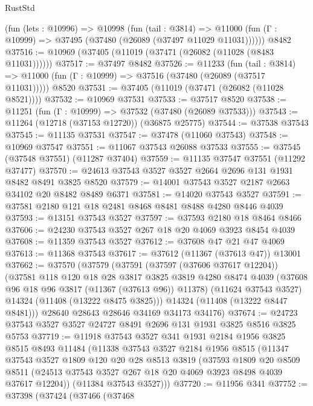 \begin{lexlean}{RustStd}
\begin{coremodule}
    (fun (lets : @10996) =>
    @10998
      (fun (tail : @3814) =>
      @11000 (fun (Γ : @10999) => @37495 (@37480 (@26089 (@37497 @11029 @11031))))))
    @8482
@37516 := @10969 (@37405 (@11019 (@37471 (@26082 (@11028 (@8483 @11031))))))
@37517 := @37497 @8482
@37526 := @11233
    (fun (tail : @3814) => @11000 (fun (Γ : @10999) => @37516 (@37480 (@26089 (@37517 @11031)))))
    @8520
@37531 := @37405 (@11019 (@37471 (@26082 (@11028 @8521))))
@37532 := @10969 @37531
@37533 := @37517 @8520
@37538 := @11251 (fun (Γ : @10999) => @37532 (@37480 (@26089 @37533)))
@37543 := @11264 (@12718 (@37153 @12720)) (@36875 @25775)
@37544 := @37538 @37543
@37545 := @11135 @37531
@37547 := @37478 (@11060 @37543)
@37548 := @10969 @37547
@37551 := @11067 @37543 @26088 @37533
@37555 := @37545 (@37548 @37551) (@11287 @37404)
@37559 := @11135 @37547 @37551 (@11292 @37477)
@37570 := @24613 @37543 @3527 @3527 @2664 @2696 @131 @1931 @8482 @8491 @3825 @8520
@37579 := @14001 @37543 @3527 @2187 @2663 @34102 @20 @8482 @8489 @6371
@37581 := @14020 @37543 @3527
@37591 := @37581 @2180 @121 @18 @2481 @8468 @8481 @8488 @4280 @8446 @4039
@37593 := @13151 @37543 @3527
@37597 := @37593 @2180 @18 @8464 @8466
@37606 := @24230 @37543 @3527 @267 @18 @20 @4069 @3923 @8454 @4039
@37608 := @11359 @37543 @3527
@37612 := @37608 @47 @21 @47 @4069
@37613 := @11368 @37543
@37617 := @37612 (@11367 (@37613 @47)) @13001
@37662 := @37570
    (@37579
      (@37591
        (@37597 (@37606 @37617 @12204))
        (@37581
          @118
          @120
          @18
          @28
          @3817
          @3825
          @3819
          @4280
          @8474
          @4039
          (@37608 @96 @18 @96 @3817 (@11367 (@37613 @96)) @11378)
          (@11624 @37543 @3527)
          @14324
          (@11408 (@13222 @8475 @3825)))
        @14324
        (@11408 (@13222 @8447 @8481)))
      @28640
      @28643
      @28646
      @34169
      @34173
      @34176)
@37674 := @24723 @37543 @3527 @3527 @24727 @8491 @2696 @131 @1931 @3825 @8516 @3825 @5753
@37719 := @11918
    @37543
    @3527
    @341
    @1931
    @2184
    @1956
    @3825
    @8515
    @8493
    @11484
    (@11338
      @37543
      @3527
      @2184
      @1956
      @8515
      (@11347
        @37543
        @3527
        @1809
        @120
        @20
        @28
        @8513
        @3819
        (@37593
          @1809
          @20
          @8509
          @8511
          (@24513 @37543 @3527 @267 @18 @20 @4069 @3923 @8498 @4039 @37617 @12204))
        (@11384 @37543 @3527)))
@37720 := @11956 @341
@37752 := @37398
    (@37424
      (@37466
        (@37468

\end{coremodule}
\end{lexlean}
